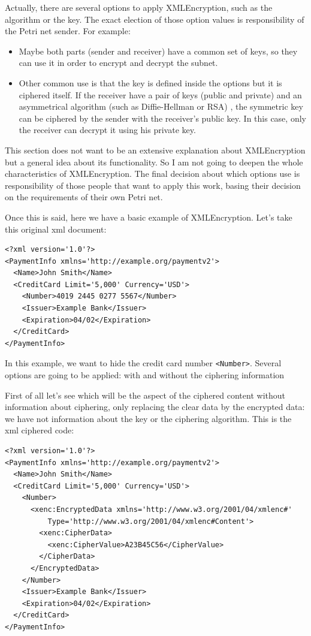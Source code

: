 Actually, there are several options to apply XMLEncryption, such as the algorithm
or the key. The exact election of those option values is responsibility of the Petri net sender. For example:
\begin{itemize}
 \item Maybe both parts (sender and receiver) have a common
set of keys, so they can use it in order to encrypt and decrypt the subnet.
 \item Other common use is that
the key is defined inside the options but it is ciphered itself. If the receiver
have a pair of keys (public and private) and an asymmetrical algorithm (such as Diffie-Hellman or RSA) , the symmetric key can be ciphered by
the sender with the receiver's public key. In this case, only the receiver
can decrypt it using his private key.
\end{itemize}This section does not want to be an extensive explanation about XMLEncryption
but a general idea about its functionality. So I am not going to deepen the
whole characteristics of XMLEncryption. The final decision about which options
use is responsibility of those people that want to apply this work, basing their decision on the requirements of their own Petri net. 
 
Once this is said, here we have a basic example of XMLEncryption. Let's take this original xml document:

\begin{lstlisting}[label=xmlenc_example_1_1,caption=Clear xml content]
<?xml version='1.0'?>
<PaymentInfo xmlns='http://example.org/paymentv2'>
  <Name>John Smith</Name>
  <CreditCard Limit='5,000' Currency='USD'>
    <Number>4019 2445 0277 5567</Number>
    <Issuer>Example Bank</Issuer>
    <Expiration>04/02</Expiration>
  </CreditCard>
</PaymentInfo>
\end{lstlisting}

In this example, we want to hide the credit card number \texttt{\textless Number\textgreater}. Several options are going to be applied: with and without
the ciphering information


First of all let's see which will be the aspect of the ciphered content without
information about ciphering, only replacing the clear data by the encrypted
data:
we have not information about  the key or the ciphering algorithm. This
is the xml ciphered code:
\begin{lstlisting}[label=xmlenc_example_1_2,caption=Ciphered xml content
without ciphering information]
<?xml version='1.0'?>
<PaymentInfo xmlns='http://example.org/paymentv2'>
  <Name>John Smith</Name>
  <CreditCard Limit='5,000' Currency='USD'>
    <Number>
      <xenc:EncryptedData xmlns='http://www.w3.org/2001/04/xmlenc#'
          Type='http://www.w3.org/2001/04/xmlenc#Content'>
        <xenc:CipherData>
          <xenc:CipherValue>A23B45C56</CipherValue>
        </CipherData>
      </EncryptedData>
    </Number>
    <Issuer>Example Bank</Issuer>
    <Expiration>04/02</Expiration>
  </CreditCard>
</PaymentInfo>
\end{lstlisting}

